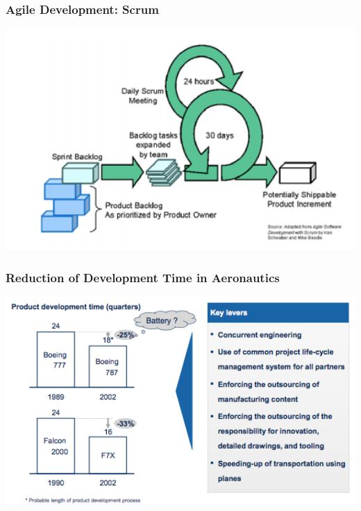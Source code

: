 \subsubsection{Agile Development: Scrum}
\includegraphics[width=1\textwidth]{W03/scrum}
\subsubsection{Reduction of Development Time in Aeronautics}
\includegraphics[width=1\textwidth]{W03/concurrent}
